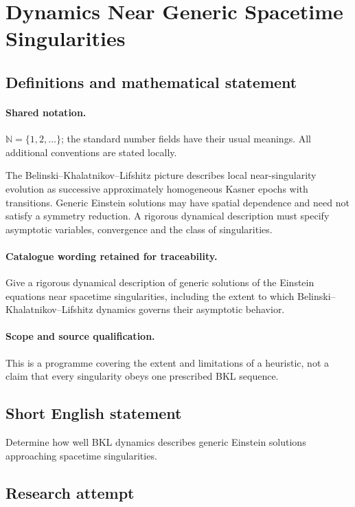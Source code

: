 \documentclass[11pt]{article}
\begin{document}
\section{Dynamics Near Generic Spacetime Singularities}\label{statement}

\subsection{Definitions and mathematical statement}

\paragraph{Shared notation.}$\mathbb N=\{1,2,\ldots\}$; the standard number fields have their usual meanings. All additional conventions are stated locally.


The Belinski--Khalatnikov--Lifshitz picture describes local near-singularity evolution as successive approximately homogeneous Kasner epochs with transitions. Generic Einstein solutions may have spatial dependence and need not satisfy a symmetry reduction. A rigorous dynamical description must specify asymptotic variables, convergence and the class of singularities.

\paragraph{Catalogue wording retained for traceability.}
Give a rigorous dynamical description of generic solutions of the Einstein equations near spacetime singularities, including the extent to which Belinski–Khalatnikov–Lifshitz dynamics governs their asymptotic behavior.

\paragraph{Scope and source qualification.}This is a programme covering the extent and limitations of a heuristic, not a claim that every singularity obeys one prescribed BKL sequence.
\subsection{Short English statement}
Determine how well BKL dynamics describes generic Einstein solutions approaching spacetime singularities.
\subsection{Research attempt}
\end{document}
